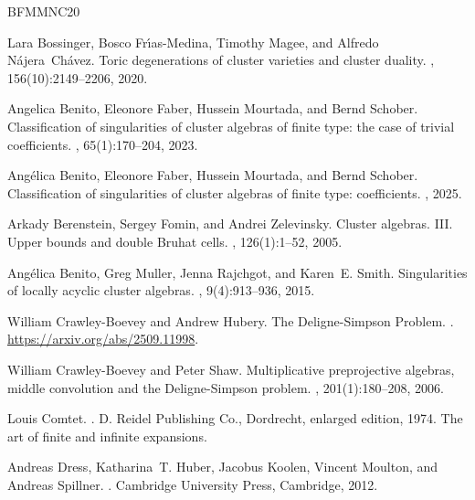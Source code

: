 \documentclass[letter,11pt]{amsart}
\theoremstyle{theorem}
\theoremstyle{definition}
\numberwithin{equation}{section}
\begin{document}
%
%

\newcommand{\etalchar}[1]{$^{#1}$}
\def\cprime{$'$}
\begin{thebibliography}{BFMMNC20}

Lara Bossinger, Bosco Fr\'{\i}as-Medina, Timothy Magee, and Alfredo
  N\'{a}jera~Ch\'{a}vez.
\newblock Toric degenerations of cluster varieties and cluster duality.
, 156(10):2149--2206, 2020.

Angelica Benito, Eleonore Faber, Hussein Mourtada, and Bernd Schober.
\newblock Classification of singularities of cluster algebras of finite type:
  the case of trivial coefficients.
, 65(1):170--204, 2023.

Ang\'{e}lica Benito, Eleonore Faber, Hussein Mourtada, and Bernd Schober.
\newblock Classification of singularities of cluster algebras of finite type:
  coefficients.
, 2025.

Arkady Berenstein, Sergey Fomin, and Andrei Zelevinsky.
\newblock Cluster algebras. {III}. {U}pper bounds and double {B}ruhat cells.
, 126(1):1--52, 2005.

Ang\'{e}lica Benito, Greg Muller, Jenna Rajchgot, and Karen~E. Smith.
\newblock Singularities of locally acyclic cluster algebras.
, 9(4):913--936, 2015.

William Crawley-Boevey and Andrew Hubery.
\newblock The {D}eligne-{S}impson {P}roblem.
.
\newblock \url{https://arxiv.org/abs/2509.11998}.

William Crawley-Boevey and Peter Shaw.
\newblock Multiplicative preprojective algebras, middle convolution and the
  {D}eligne-{S}impson problem.
, 201(1):180--208, 2006.

Louis Comtet.
.
\newblock D. Reidel Publishing Co., Dordrecht, enlarged edition, 1974.
\newblock The art of finite and infinite expansions.

\bibitem[DHK{\etalchar{+}}12]{phylo}
Andreas Dress, Katharina~T. Huber, Jacobus Koolen, Vincent Moulton, and Andreas
  Spillner.
.
\newblock Cambridge University Press, Cambridge, 2012.


\end{thebibliography}
\end{document}
